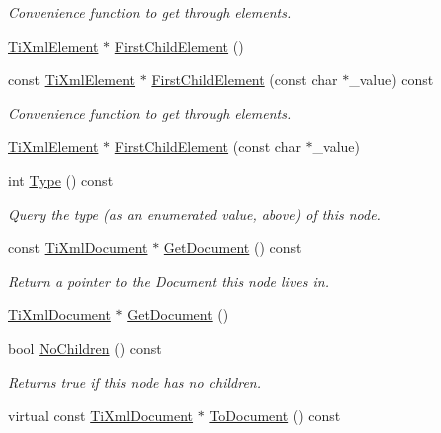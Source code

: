 \begin{DoxyCompactItemize}
\begin{DoxyCompactList}\small\item\em Convenience function to get through elements. \end{DoxyCompactList}\item 
\hyperlink{class_ti_xml_element}{TiXmlElement} $\ast$ \hyperlink{class_ti_xml_node_aa0fecff1f3866ab33a8a25506e95db1d}{FirstChildElement} ()
\item 
const \hyperlink{class_ti_xml_element}{TiXmlElement} $\ast$ \hyperlink{class_ti_xml_node_a0ec361bfef1cf1978d060295f597e0d9}{FirstChildElement} (const char $\ast$\_\-value) const 
\begin{DoxyCompactList}\small\item\em Convenience function to get through elements. \end{DoxyCompactList}\item 
\hyperlink{class_ti_xml_element}{TiXmlElement} $\ast$ \hyperlink{class_ti_xml_node_a6936ae323675071808ac4840379e57f5}{FirstChildElement} (const char $\ast$\_\-value)
\item 
int \hyperlink{class_ti_xml_node_a57b99d5c97d67a42b9752f5210a1ba5e}{Type} () const 
\begin{DoxyCompactList}\small\item\em Query the type (as an enumerated value, above) of this node. \end{DoxyCompactList}\item 
const \hyperlink{class_ti_xml_document}{TiXmlDocument} $\ast$ \hyperlink{class_ti_xml_node_aa66f4ebcd175204a168ed7c2d7b43071}{GetDocument} () const 
\begin{DoxyCompactList}\small\item\em Return a pointer to the Document this node lives in. \end{DoxyCompactList}\item 
\hyperlink{class_ti_xml_document}{TiXmlDocument} $\ast$ \hyperlink{class_ti_xml_node_a7b2372c0e7adfb32f5b6902fe49a39b2}{GetDocument} ()
\item 
bool \hyperlink{class_ti_xml_node_aeed21ad30630ef6e7faf096127edc9f3}{NoChildren} () const 
\begin{DoxyCompactList}\small\item\em Returns true if this node has no children. \end{DoxyCompactList}\item 
virtual const \hyperlink{class_ti_xml_document}{TiXmlDocument} $\ast$ \hyperlink{class_ti_xml_node_a8a4cda4b15c29f64cff419309aebed08}{ToDocument} () const 

\end{DoxyCompactItemize}
